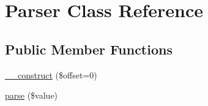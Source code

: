 \hypertarget{class_symfony_1_1_component_1_1_yaml_1_1_parser}{
\section{\-Parser \-Class \-Reference}
\label{class_symfony_1_1_component_1_1_yaml_1_1_parser}
}
\subsection*{\-Public \-Member \-Functions}
\begin{DoxyCompactItemize}
\item 
\hyperlink{class_symfony_1_1_component_1_1_yaml_1_1_parser_aa9388d8255ba88ef404307c6aee9fb37}{\-\_\-\-\_\-construct} (\$offset=0)
\item 
\hyperlink{class_symfony_1_1_component_1_1_yaml_1_1_parser_ae646f55333c0c77dc5b912df945862c5}{parse} (\$value)
\end{DoxyCompactItemize}
